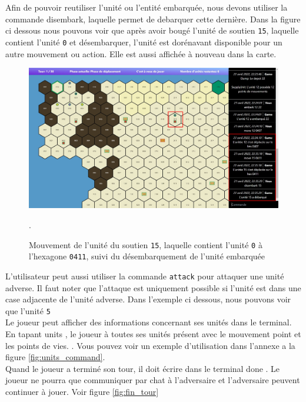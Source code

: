 Afin de pouvoir reutiliser l'unité ou l'entité embarquée, nous devons utiliser la commande disembark, laquelle permet de debarquer cette dernière.
Dans la figure ci dessous nous pouvons voir que après avoir bougé l'unité de soutien {\tt 15}, laquelle contient l'unité {\tt 0} et désembarquer, l'unité est dorénavant disponible pour un autre mouvement ou action. Elle est aussi affichée à nouveau dans la carte.\\

\begin{figure}[H]
    \centering
    \includegraphics[scale=0.35]{data/Disembark.jpg}
    \caption{Mouvement de l'unité du soutien \lstinline{15}, laquelle contient l'unité \lstinline{0} à l'hexagone \lstinline{0411}, suivi du désembarquement de l'unité embarquée}.
\end{figure}

L'utilisateur peut aussi utiliser la commande {\tt attack} pour attaquer une unité adverse. Il faut noter que l'attaque est uniquement possible si l'unité est dans une case adjacente de l'unité adverse. Dans l'exemple ci dessous, nous pouvons voir que l'unité {\tt 5} \\

Le joueur peut afficher des informations concernant ses unités dans le terminal.
En tapant \og units \fg{}, le joueur à toutes ses unités présent avec le mouvement point et  les points de vies.
. Vous pouvez voir un exemple d'utilisation dans l'annexe a la figure \ref{fig:units_command}. \\




Quand le joueur a terminé son tour, il doit écrire dans le terminal \og done \fg{}. Le joueur ne pourra que communiquer par chat à l'adversaire et l'adversaire peuvent continuer à jouer. Voir figure \ref{fig:fin_tour}\\



